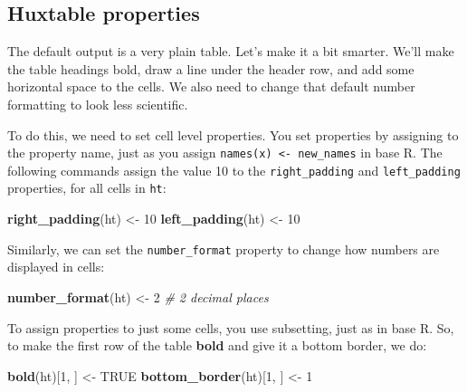 \documentclass[]{article}
\newenvironment{Shaded}{\begin{snugshade}}{\end{snugshade}}
\newcommand{\CommentTok}[1]{\textcolor[rgb]{0.56,0.35,0.01}{\textit{#1}}}
\newcommand{\DecValTok}[1]{\textcolor[rgb]{0.00,0.00,0.81}{#1}}
\newcommand{\KeywordTok}[1]{\textcolor[rgb]{0.13,0.29,0.53}{\textbf{#1}}}
\newcommand{\NormalTok}[1]{#1}
\newcommand{\OtherTok}[1]{\textcolor[rgb]{0.56,0.35,0.01}{#1}}
\newcommand{\StringTok}[1]{\textcolor[rgb]{0.31,0.60,0.02}{#1}}
\begin{document}
\hypertarget{huxtable-properties}{%
\subsection{Huxtable properties}\label{huxtable-properties}}

The default output is a very plain table. Let's make it a bit smarter.
We'll make the table headings bold, draw a line under the header row,
and add some horizontal space to the cells. We also need to change that
default number formatting to look less scientific.

To do this, we need to set cell level properties. You set properties by
assigning to the property name, just as you assign
\texttt{names(x)\ \textless{}-\ new\_names} in base R. The following
commands assign the value 10 to the \texttt{right\_padding} and
\texttt{left\_padding} properties, for all cells in \texttt{ht}:

\begin{Shaded}
\begin{Highlighting}[]
\KeywordTok{right_padding}\NormalTok{(ht) <-}\StringTok{ }\DecValTok{10}
\KeywordTok{left_padding}\NormalTok{(ht)  <-}\StringTok{ }\DecValTok{10}
\end{Highlighting}
\end{Shaded}

\FloatBarrier

Similarly, we can set the \texttt{number\_format} property to change how
numbers are displayed in cells:

\begin{Shaded}
\begin{Highlighting}[]
\KeywordTok{number_format}\NormalTok{(ht) <-}\StringTok{ }\DecValTok{2}    \CommentTok{# 2 decimal places}
\end{Highlighting}
\end{Shaded}

\FloatBarrier

To assign properties to just some cells, you use subsetting, just as in
base R. So, to make the first row of the table \textbf{bold} and give it
a bottom border, we do:

\begin{Shaded}
\begin{Highlighting}[]
\KeywordTok{bold}\NormalTok{(ht)[}\DecValTok{1}\NormalTok{, ]          <-}\StringTok{ }\OtherTok{TRUE}
\KeywordTok{bottom_border}\NormalTok{(ht)[}\DecValTok{1}\NormalTok{, ] <-}\StringTok{ }\DecValTok{1}
\end{Highlighting}
\end{Shaded}
\end{document}
